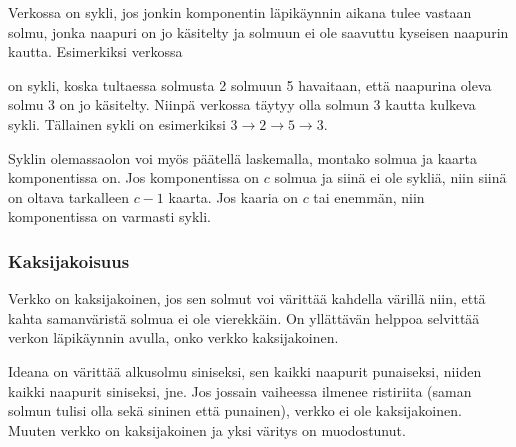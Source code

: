 Verkossa on sykli,
jos jonkin komponentin läpikäynnin
aikana tulee vastaan solmu,
jonka naapuri on jo käsitelty
ja solmuun ei ole saavuttu kyseisen naapurin kautta.
Esimerkiksi verkossa
\begin{center}
\end{center}
on sykli, koska tultaessa solmusta 2 solmuun 5
havaitaan, että naapurina oleva solmu 3 on jo käsitelty.
Niinpä verkossa täytyy olla solmun 3 kautta
kulkeva sykli.
Tällainen sykli on esimerkiksi
$3 \rightarrow 2 \rightarrow 5 \rightarrow 3$.

Syklin olemassaolon voi myös päätellä laskemalla,
montako solmua ja kaarta komponentissa on.
Jos komponentissa on $c$ solmua ja siinä ei ole sykliä,
niin siinä on oltava tarkalleen $c-1$ kaarta.
Jos kaaria on $c$ tai enemmän, niin komponentissa
on varmasti sykli.

\subsubsection{Kaksijakoisuus}


Verkko on kaksijakoinen,
jos sen solmut voi värittää
kahdella värillä
niin, että kahta samanväristä
solmua ei ole vierekkäin.
On yllättävän helppoa selvittää
verkon läpikäynnin avulla,
onko verkko kaksijakoinen.

Ideana on värittää alkusolmu
siniseksi, sen kaikki naapurit
punaiseksi, niiden kaikki naapurit
siniseksi, jne.
Jos jossain vaiheessa
ilmenee ristiriita
(saman solmun tulisi olla sekä
sininen että punainen),
verkko ei ole kaksijakoinen.
Muuten verkko on kaksijakoinen
ja yksi väritys on muodostunut.

